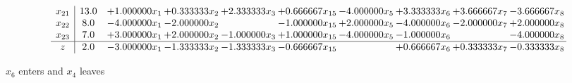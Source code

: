\documentclass[10pt]{article}
\begin{document}
\[\begin{array}{c| c c@{\hskip 2pt} c@{\hskip 2pt} c@{\hskip 2pt} c@{\hskip 2pt} c@{\hskip 2pt} c@{\hskip 2pt} c@{\hskip 2pt} c@{\hskip 2pt} }
 x_{21}   &  13.0 & + 1.000000 x_{1} & + 0.333333 x_{2} & + 2.333333 x_{3} & + 0.666667 x_{15} & -4.000000 x_{5} & + 3.333333 x_{6} & + 3.666667 x_{7} & -3.666667 x_{8}\\
 x_{22}   &  8.0 & -4.000000 x_{1} & -2.000000 x_{2} &   & -1.000000 x_{15} & + 2.000000 x_{5} & -4.000000 x_{6} & -2.000000 x_{7} & + 2.000000 x_{8}\\
 x_{23}   &  7.0 & + 3.000000 x_{1} & + 2.000000 x_{2} & -1.000000 x_{3} & + 1.000000 x_{15} & -4.000000 x_{5} & -1.000000 x_{6} &   & -4.000000 x_{8}\\
\hline
z    &  2.0 & -3.000000 x_{1} & -1.333333 x_{2} & -1.333333 x_{3} & -0.666667 x_{15} &   & + 0.666667 x_{6} & + 0.333333 x_{7} & -0.333333 x_{8}\\
\end{array}\]


 $ x_{6} $ enters and $ x_{4} $ leaves 
\end{document}
